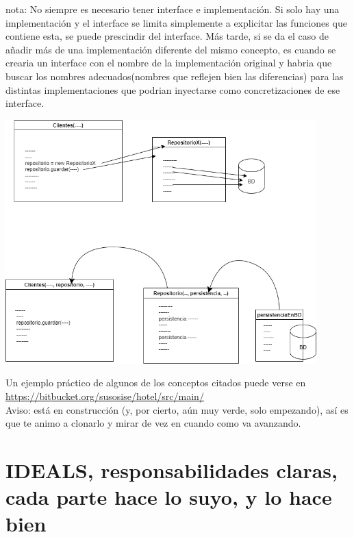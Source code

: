 \documentclass[spanish,12pt,a4paper,final,oneside]{book}
\begin{document}
\vspace{0.5cm}
nota: No siempre es necesario tener interface e implementación. Si solo hay una implementación y el interface se limita simplemente a explicitar las funciones que contiene esta, se puede prescindir del interface. Más tarde, si se da el caso de añadir más de una implementación diferente del mismo concepto, es cuando se crearia un interface con el nombre de la implementación original y habria que buscar los nombres adecuados(nombres que reflejen bien las diferencias) para las distintas implementaciones que podrian inyectarse como concretizaciones de ese interface.
\begin{center}
\includegraphics[width=0.9\textwidth]{ejemplo de inyeccion de dependencias - sin interfaces}
\end{center}

\vspace{1cm}
\begin{footnotesize}
Un ejemplo práctico de algunos de los conceptos citados puede verse en
\\\url{https://bitbucket.org/susosise/hotel/src/main/}
\\Aviso: está en construcción (y, por cierto, aún muy verde, solo empezando), así es que te animo a clonarlo y mirar de vez en cuando como va avanzando.
\end{footnotesize}
\vspace{1cm}




\section{IDEALS, responsabilidades claras, cada parte hace lo suyo, y lo hace bien}
\end{document}

